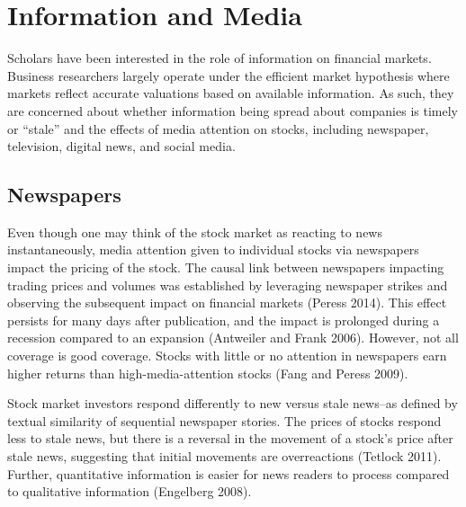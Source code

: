 \documentclass[12pt,]{article}
\begin{document}
\hypertarget{information-and-media}{%
\section{Information and Media}\label{information-and-media}}

Scholars have been interested in the role of information on financial
markets. Business researchers largely operate under the efficient market
hypothesis where markets reflect accurate valuations based on available
information. As such, they are concerned about whether information being
spread about companies is timely or ``stale'' and the effects of media
attention on stocks, including newspaper, television, digital news, and
social media.

\hypertarget{newspapers}{%
\subsection{Newspapers}\label{newspapers}}

Even though one may think of the stock market as reacting to news
instantaneously, media attention given to individual stocks via
newspapers impact the pricing of the stock. The causal link between
newspapers impacting trading prices and volumes was established by
leveraging newspaper strikes and observing the subsequent impact on
financial markets (Peress 2014). This effect persists for many days
after publication, and the impact is prolonged during a recession
compared to an expansion (Antweiler and Frank 2006). However, not all
coverage is good coverage. Stocks with little or no attention in
newspapers earn higher returns than high-media-attention stocks (Fang
and Peress 2009).

Stock market investors respond differently to new versus stale news--as
defined by textual similarity of sequential newspaper stories. The
prices of stocks respond less to stale news, but there is a reversal in
the movement of a stock's price after stale news, suggesting that
initial movements are overreactions (Tetlock 2011). Further,
quantitative information is easier for news readers to process compared
to qualitative information (Engelberg 2008).
\end{document}
